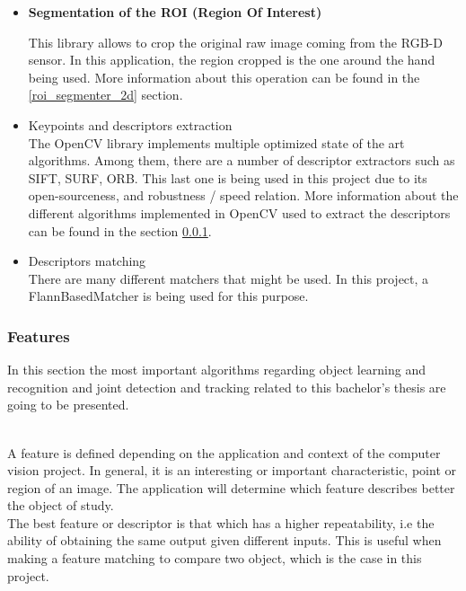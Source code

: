 \begin{itemize}
	\item\textbf{Segmentation of the ROI (Region Of Interest)\\ }

	This library allows to crop the original raw image coming
	from the RGB-D sensor. In this application, the region cropped is the one around the hand being used. More information about this operation can be found in the \ref{roi_segmenter_2d} section. 
	

	\item {Keypoints and descriptors extraction\\ }
	 The OpenCV library implements multiple optimized state of the art algorithms. Among them, there are a number of descriptor extractors such as SIFT, SURF, ORB. This last one is being used in this project due to its open-sourceness, and robustness / speed relation. More information about the different algorithms implemented in OpenCV used to extract the descriptors can be found in the section \ref{features}.


	\item {Descriptors matching\\ } There are many different matchers that might be used. In this project, a FlannBasedMatcher
	is being used for this purpose. 
\end{itemize}



\subsubsection{Features}
\label{features}
In this section the most important algorithms regarding object learning and recognition and joint detection and tracking related to this bachelor's thesis are going to be presented.

\\
A feature is defined depending on the application and context of the computer vision project. In general, it is an interesting or important characteristic, point or region of an image. The application will determine which feature describes better the object of study. 
\\

The best feature or descriptor is that which has a higher repeatability, i.e the ability of obtaining the same output given different inputs. This is useful when making a feature matching to compare two object, which is the case in this project. 
\\

